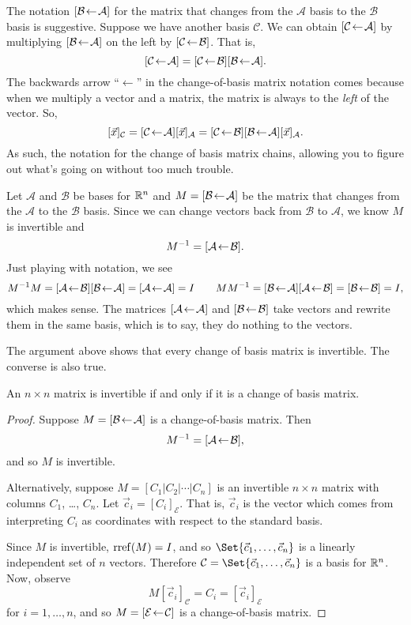 The notation $\BasisChange{\mathcal A}{\mathcal B}$ for the matrix that changes from the $\mathcal A$ basis to
the $\mathcal B$ basis is suggestive. Suppose we have another basis $\mathcal C$. We can obtain
$\BasisChange{\mathcal A}{\mathcal C}$ by multiplying $\BasisChange{\mathcal A}{\mathcal B}$ on the left by $\BasisChange{\mathcal B}{\mathcal C}$.
That is,
\[
	\BasisChange{\mathcal A}{\mathcal C}=\BasisChange{\mathcal B}{\mathcal C}\BasisChange{\mathcal A}{\mathcal B}.
\]
The backwards arrow ``$\leftarrow$'' in the change-of-basis matrix notation comes because when we multiply a
vector and a matrix, the matrix is always to the \emph{left} of the vector. So, \[
	[\vec x]_{\mathcal C}=
	\BasisChange{\mathcal A}{\mathcal C}[\vec x]_{\mathcal A}
	=\BasisChange{\mathcal B}{\mathcal C}\BasisChange{\mathcal A}{\mathcal B}[\vec x]_{\mathcal A}.
\]
As such, the notation for the change of basis matrix chains, allowing you to figure out what's going on without too much trouble.


Let $\mathcal A$ and $\mathcal B$ be bases for $\R^n$ and $M=\BasisChange{\mathcal A}{\mathcal B}$ be the matrix
that changes from the $\mathcal A$ to the $\mathcal B$ basis. Since we can change vectors back from $\mathcal B$ to
$\mathcal A$, we know $M$ is invertible and
\[
	M^{-1}=\BasisChange{\mathcal B}{\mathcal A}.
\]
Just playing with notation, we see
\[
	M^{-1}M=\BasisChange{\mathcal B}{\mathcal A}\BasisChange{\mathcal A}{\mathcal B}=\BasisChange{\mathcal A}{\mathcal A} = I\qquad
	MM^{-1}=\BasisChange{\mathcal A}{\mathcal B}\BasisChange{\mathcal B}{\mathcal A}=\BasisChange{\mathcal B}{\mathcal B} = I,
\]
which makes sense. The matrices $\BasisChange{\mathcal A}{\mathcal A}$ and $\BasisChange{\mathcal B}{\mathcal B}$
take vectors and rewrite them in the same basis, which is to say, they do nothing to the vectors.

The argument above shows that every change of basis matrix is invertible. The converse is also true.

\begin{theorem}
	An $n\times n$ matrix is invertible if and only if it is a change of basis matrix.
\end{theorem}
\begin{proof}
	Suppose $M=\BasisChange{\mathcal A}{\mathcal B}$ is a change-of-basis matrix. Then
	\[
		M^{-1}=\BasisChange{\mathcal B}{\mathcal A},
	\]
	and so $M$ is invertible.

	Alternatively, suppose $M=[C_1|C_2|\cdots|C_n]$ is an invertible $n\times n$ matrix with columns $C_1$, \ldots, $C_n$.
	Let $\vec c_i=[C_i]_{\mathcal E}$. That is, $\vec c_i$ is the vector which comes from interpreting $C_i$ as coordinates
	with respect to the standard basis.

	Since $M$ is invertible, $\Rref(M)=I$, and so $\Set{\vec c_1,\ldots,\vec c_n}$ is a linearly independent set of $n$ vectors.
	Therefore $\mathcal C=\Set{\vec c_1,\ldots,\vec c_n}$ is a basis for $\R^n$. Now, observe
	\[
		M[\vec c_i]_{\mathcal C} = C_i=[\vec c_i]_{\mathcal E}
	\]
	for $i=1,\ldots, n$,
	and so $M=\BasisChange{\mathcal C}{\mathcal E}$ is a change-of-basis matrix.
\end{proof}

